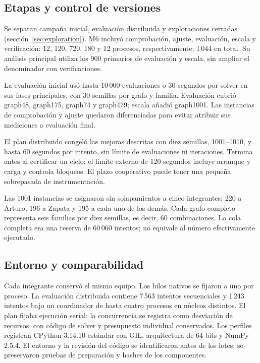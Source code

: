 \subsection{Etapas y control de versiones}
Se separan campaña inicial, evaluación distribuida y exploraciones cerradas (sección~\ref{sec:exploration}). M6 incluyó comprobación, ajuste, evaluación, escala y verificación: 12, 120, 720, 180 y 12 procesos, respectivamente; 1\,044 en total. Su análisis principal utiliza los 900 primarios de evaluación y escala, sin ampliar el denominador con verificaciones.

La evaluación inicial usó hasta 10\,000 evaluaciones o 30 segundos por solver en sus fases principales, con 30 semillas por grafo y familia. Evaluación cubrió graph48, graph175, graph74 y graph479; escala añadió graph1001. Las instancias de comprobación y ajuste quedaron diferenciadas para evitar atribuir sus mediciones a evaluación final.

El plan distribuido congeló las mejoras descritas con diez semillas, 1001--1010, y hasta 60 segundos por intento, sin límite de evaluaciones ni iteraciones. Termina antes al certificar un ciclo; el límite externo de 120 segundos incluye arranque y carga y controla bloqueos. El plazo cooperativo puede tener una pequeña sobrepasada de instrumentación.

Las 1001 instancias se asignaron sin solapamientos a cinco integrantes: 220 a Arturo, 196 a Zapata y 195 a cada uno de los demás. Cada grafo completo representa seis familias por diez semillas, es decir, 60 combinaciones. La cola completa era una reserva de 60\,060 intentos; no equivale al número efectivamente ejecutado.

\subsection{Entorno y comparabilidad}
Cada integrante conservó el mismo equipo. Los hilos nativos se fijaron a uno por proceso. La evaluación distribuida contiene 7\,563 intentos secuenciales y 1\,243 intentos bajo un coordinador de hasta cuatro procesos en núcleos distintos. El plan fijaba ejecución serial: la concurrencia se registra como desviación de recursos, con código de solver y presupuesto individual conservados. Los perfiles registran CPython 3.14.10 estándar con GIL, arquitectura de 64 bits y NumPy 2.5.4. El entorno y la revisión del código se identificaron antes de los lotes; se preservaron pruebas de preparación y hashes de los componentes.

